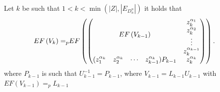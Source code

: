 \documentclass[11pt]{llncs}
\begin{document}
\begin{proposition}\label{prop:rowEchelonForm}
    Let $k$ be such that $1<k< \min{\left(|Z|,|E_{D_n^n}|\right)}$ it holds that
    \begin{align*}
        EF\left(V_{k}\right) =_p & EF
        \begin{pmatrix}
        \begin{pmatrix}
            \multicolumn{4}{c}{\multirow{4}{*}{$EF\left(V_{k-1}\right)$}} & z_k^{\alpha_1}\\
            & & & & z_k^{\alpha_2}\\
            & & & & \vdots\\
            & & & & z_{k}^{\alpha_{k-1}}\\
            (z_1^{\alpha_{k}} & z_2^{\alpha_{k}}& \cdots & z_{k-1}^{\alpha_{k}})P_{k-1} & z_{k}^{\alpha_k}
        \end{pmatrix}
        \end{pmatrix}.
    \end{align*}
    where $P_{k-1}$ is such that $U_{k-1}^{-1} = P_{k-1}$, where $V_{k-1} = L_{k-1}U_{k-1}$ with $EF(V_{k-1})=_p L_{k-1}$
\end{proposition}
\end{document}

